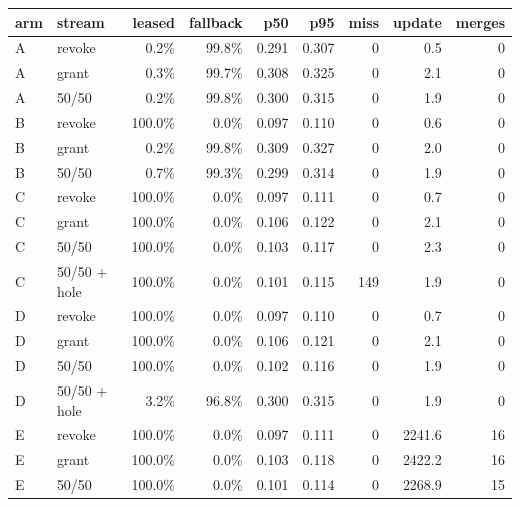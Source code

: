 \begin{tabular}{@{}llrrrrrrr@{}}
\toprule
arm & stream & leased & fallback & p50 & p95 & \auth{} miss & update & merges \\
\midrule
A & revoke & 0.2\% & 99.8\% & 0.291 & 0.307 & 0 & 0.5 & 0 \\
A & grant & 0.3\% & 99.7\% & 0.308 & 0.325 & 0 & 2.1 & 0 \\
A & 50/50 & 0.2\% & 99.8\% & 0.300 & 0.315 & 0 & 1.9 & 0 \\
B & revoke & 100.0\% & 0.0\% & 0.097 & 0.110 & 0 & 0.6 & 0 \\
B & grant & 0.2\% & 99.8\% & 0.309 & 0.327 & 0 & 2.0 & 0 \\
B & 50/50 & 0.7\% & 99.3\% & 0.299 & 0.314 & 0 & 1.9 & 0 \\
C & revoke & 100.0\% & 0.0\% & 0.097 & 0.111 & 0 & 0.7 & 0 \\
C & grant & 100.0\% & 0.0\% & 0.106 & 0.122 & 0 & 2.1 & 0 \\
C & 50/50 & 100.0\% & 0.0\% & 0.103 & 0.117 & 0 & 2.3 & 0 \\
C & 50/50 + hole & 100.0\% & 0.0\% & 0.101 & 0.115 & 149 & 1.9 & 0 \\
D & revoke & 100.0\% & 0.0\% & 0.097 & 0.110 & 0 & 0.7 & 0 \\
D & grant & 100.0\% & 0.0\% & 0.106 & 0.121 & 0 & 2.1 & 0 \\
D & 50/50 & 100.0\% & 0.0\% & 0.102 & 0.116 & 0 & 1.9 & 0 \\
D & 50/50 + hole & 3.2\% & 96.8\% & 0.300 & 0.315 & 0 & 1.9 & 0 \\
E & revoke & 100.0\% & 0.0\% & 0.097 & 0.111 & 0 & 2241.6 & 16 \\
E & grant & 100.0\% & 0.0\% & 0.103 & 0.118 & 0 & 2422.2 & 16 \\
E & 50/50 & 100.0\% & 0.0\% & 0.101 & 0.114 & 0 & 2268.9 & 15 \\
\bottomrule
\end{tabular}
